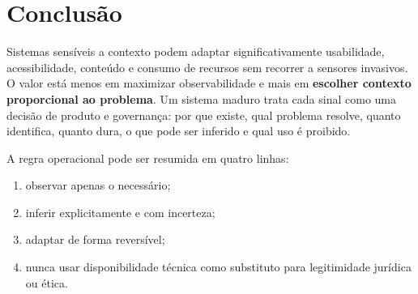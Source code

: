 \documentclass[11pt,a4paper]{article}
\begin{document}
\section{Conclusão}
Sistemas sensíveis a contexto podem adaptar significativamente usabilidade, acessibilidade, conteúdo e consumo de recursos sem recorrer a sensores invasivos. O valor está menos em maximizar observabilidade e mais em \textbf{escolher contexto proporcional ao problema}. Um sistema maduro trata cada sinal como uma decisão de produto e governança: por que existe, qual problema resolve, quanto identifica, quanto dura, o que pode ser inferido e qual uso é proibido.

A regra operacional pode ser resumida em quatro linhas:
\begin{enumerate}
\item observar apenas o necessário;
\item inferir explicitamente e com incerteza;
\item adaptar de forma reversível;
\item nunca usar disponibilidade técnica como substituto para legitimidade jurídica ou ética.
\end{enumerate}
\end{document}
